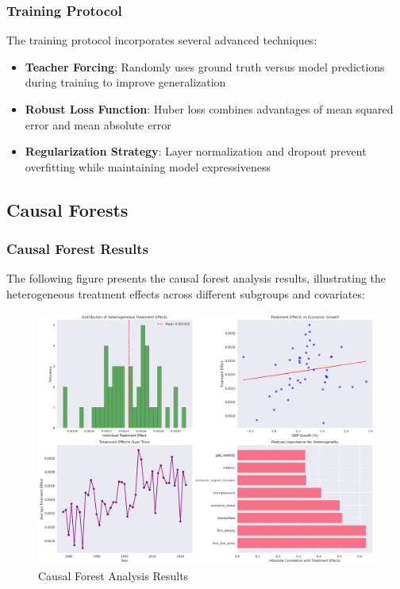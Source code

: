 \subsubsection{Training Protocol}
The training protocol incorporates several advanced techniques:
\begin{itemize}
    \item \textbf{Teacher Forcing}: Randomly uses ground truth versus model predictions during training to improve generalization
    \item \textbf{Robust Loss Function}: Huber loss combines advantages of mean squared error and mean absolute error
    \item \textbf{Regularization Strategy}: Layer normalization and dropout prevent overfitting while maintaining model expressiveness
\end{itemize}

\subsection{Causal Forests}\label{subsec:cforests}

\subsubsection{Causal Forest Results}
The following figure presents the causal forest analysis results, illustrating the heterogeneous treatment effects across different subgroups and covariates:

\begin{figure}[H]
    \centering
    \includegraphics[width=\textwidth]{figures/causal_forest_results.png}
    \caption{Causal Forest Analysis Results}
    \label{fig:causal_forest_results}
\end{figure}


